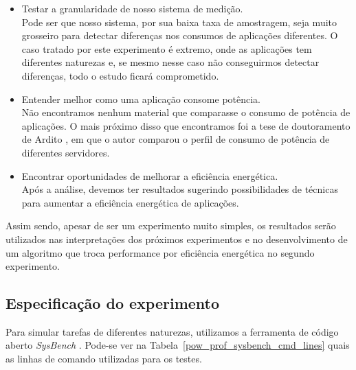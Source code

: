 \begin{itemize}
  \item Testar a granularidade de nosso sistema de medição. \\
    Pode ser que nosso sistema, por sua baixa taxa de amostragem, seja muito grosseiro para detectar diferenças nos consumos de aplicações diferentes. O caso tratado por este experimento é extremo, onde as aplicações tem diferentes naturezas e, se mesmo nesse caso não conseguirmos detectar diferenças, todo o estudo ficará comprometido.

  \item Entender melhor como uma aplicação consome potência. \\
    Não encontramos nenhum material que comparasse o consumo de potência de aplicações. O mais próximo disso que encontramos foi a tese de doutoramento de Ardito \cite{ardito2014energy}, em que o autor comparou o perfil de consumo de potência de diferentes servidores.

  \item Encontrar oportunidades de melhorar a eficiência energética. \\
    Após a análise, devemos ter resultados sugerindo possibilidades de técnicas para aumentar a eficiência energética de aplicações.
\end{itemize}

Assim sendo, apesar de ser um experimento muito simples, os resultados serão utilizados nas interpretações dos próximos experimentos e no desenvolvimento de um algoritmo que troca performance por eficiência energética no segundo experimento.

\subsection{Especificação do experimento}
Para simular tarefas de diferentes naturezas, utilizamos a ferramenta de código aberto \emph{SysBench} \cite{kopytov2004sysbench}. Pode-se ver na Tabela~\ref{pow_prof_sysbench_cmd_lines} quais as linhas de comando utilizadas para os testes.

